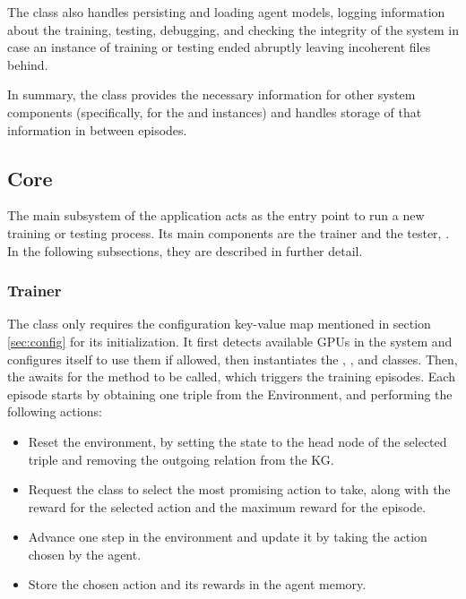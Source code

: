 The  class also handles persisting and loading agent models, logging information about the training, testing, debugging, and checking the integrity of the system in case an instance of training or testing ended abruptly leaving incoherent files behind.

In summary, the  class provides the necessary information for other system components (specifically, for the  and  instances) and handles storage of that information in between episodes.

\subsection{Core}\label{sec:framework-core}
The main subsystem of the application acts as the entry point to run a new training or testing process. Its main components are the trainer  and the tester, . In the following subsections, they are described in further detail.

\subsubsection{Trainer}
The  class only requires the configuration key-value map mentioned in section \ref{sec:config} for its initialization. It first detects available GPUs in the system and configures itself to use them if allowed, then instantiates the , , and  classes.
Then, the  awaits for the  method to be called, which triggers the training episodes. Each episode starts by obtaining one triple from the Environment, and performing the following actions:

\begin{itemize}
    \item Reset the environment, by setting the state to the head node of the selected triple and removing the outgoing relation from the KG.
    \item Request the  class to select the most promising action to take, along with the reward for the selected action and the maximum reward for the episode.
    \item Advance one step in the environment and update it by taking the action chosen by the agent.
    \item Store the chosen action and its rewards in the agent memory.
\end{itemize}

